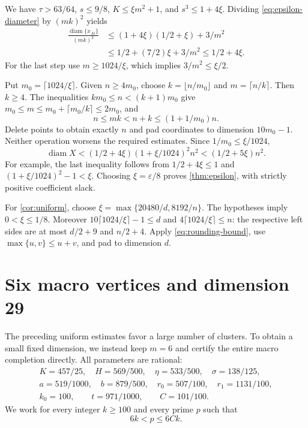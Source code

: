\documentclass[11pt]{article}
\numberwithin{equation}{section}
\theoremstyle{definition}\newtheorem{definition}[theorem]{Definition}
\theoremstyle{remark}\newtheorem{remark}[theorem]{Remark}
\DeclareMathOperator{\diam}{diam}\DeclareMathOperator{\diag}{diag}
\begin{document}
We have $\tau>63/64$, $s\le9/8$, $K\le\xi m^2+1$, and
$s^3\le1+4\xi$. Dividing \eqref{eq:epsilon-diameter} by $(mk)^2$ yields
\begin{align*}
 \frac{\diam\{x_{Ai}\}}{(mk)^2}
 &\le(1+4\xi)(1/2+\xi)+3/m^2\\
 &\le1/2+(7/2)\xi+3/m^2\le1/2+4\xi.
\end{align*}
For the last step use $m\ge1024/\xi$, which implies $3/m^2\le\xi/2$.

Put $m_0=\lceil1024/\xi\rceil$. Given $n\ge4m_0$, choose
$k=\lfloor n/m_0\rfloor$ and $m=\lceil n/k\rceil$. Then
$k\ge4$. The inequalities $km_0\le n<(k+1)m_0$ give
$m_0\le m\le m_0+\lceil m_0/k\rceil\le2m_0$, and
\[
 n\le mk<n+k\le(1+1/m_0)n.
\]
Delete points to obtain exactly $n$ and pad coordinates to dimension
$10m_0-1$. Neither operation worsens the required estimates. Since
$1/m_0\le\xi/1024$,
\begin{equation}\label{eq:rounding-bound}
 \diam X<(1/2+4\xi)(1+\xi/1024)^2n^2<(1/2+5\xi)n^2.
\end{equation}
For example, the last inequality follows from $1/2+4\xi\le1$ and
$(1+\xi/1024)^2-1<\xi$. Choosing $\xi=\varepsilon/8$ proves
\cref{thm:epsilon}, with strictly positive coefficient slack.

For \cref{cor:uniform}, choose
$\xi=\max\{20480/d,8192/n\}$. The hypotheses imply $0<\xi\le1/8$.
Moreover $10\lceil1024/\xi\rceil-1\le d$ and
$4\lceil1024/\xi\rceil\le n$: the respective left sides are at most
$d/2+9$ and $n/2+4$. Apply \eqref{eq:rounding-bound}, use
$\max\{u,v\}\le u+v$, and pad to dimension $d$.

\section{Six macro vertices and dimension 29}\label{sec:r29-proof}

The preceding uniform estimates favor a large number of clusters. To
obtain a small fixed dimension, we instead keep $m=6$ and certify the
entire macro completion directly. All parameters are rational:
\begin{equation}\label{eq:r29-parameters}
\begin{gathered}
 K=457/25,\quad H=569/500,\quad\eta=533/500,\quad\sigma=138/125,\\
 a=519/1000,\quad b=879/500,\quad r_0=507/100,\quad r_1=1131/100,\\
 k_0=100,\qquad t=971/1000,\qquad C=101/100.
\end{gathered}
\end{equation}
We work for every integer $k\ge100$ and every prime $p$ such that
\begin{equation}\label{eq:admissible-prime}
 6k<p\le6Ck.
\end{equation}
\end{document}
